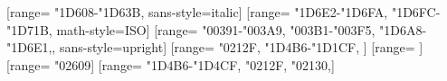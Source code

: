 \usepackage{polyglossia}

\usepackage{textcomp}

\usepackage{xltxtra}

\usepackage{unicode-math}
	[range={
		"1D608-"1D63B},		%
		sans-style=italic]
	[range={
		"1D6E2-"1D6FA,		%
		"1D6FC-"1D71B},		%
		math-style=ISO]
	[range={
		"00391-"003A9,		%
		"003B1-"003F5,		%
		"1D6A8-"1D6E1,},	%
		sans-style=upright]
	[range={
		"0212F,				%
		"1D4B6-"1D1CF,		%
	}]
	[range={
		\mathbin}] %
	[range={
		"02609}] %
	[range={
		"1D4B6-"1D4CF,
		"0212F,
		"02130,}] %

\usepackage{xeCJK}